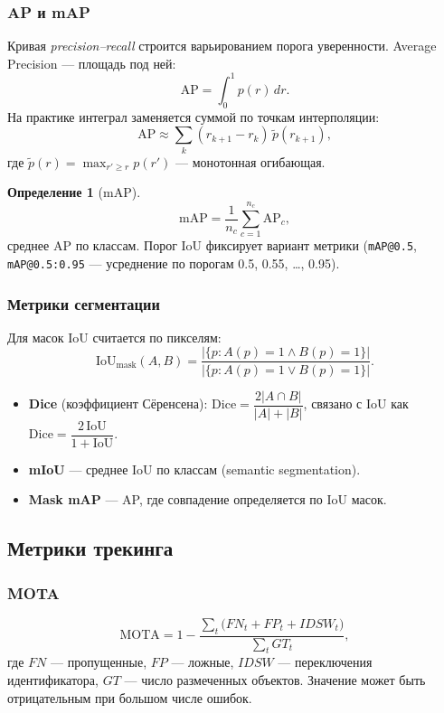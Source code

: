 \documentclass[11pt,a4paper]{article}
\theoremstyle{definition}
\newtheorem{definition}{Определение}[section]
\theoremstyle{remark}
\begin{document}
\subsubsection{AP и mAP}

Кривая \emph{precision--recall} строится варьированием порога уверенности.
Average Precision --- площадь под ней:
\[
  \mathrm{AP} = \int_0^1 p(r)\, dr .
\]
На практике интеграл заменяется суммой по точкам интерполяции:
\[
  \mathrm{AP} \approx \sum_k (r_{k+1} - r_k)\, \tilde{p}(r_{k+1}),
\]
где $\tilde{p}(r) = \max_{r' \ge r} p(r')$ --- монотонная огибающая.

\begin{definition}[mAP]
\[
  \mathrm{mAP} = \frac{1}{n_c} \sum_{c=1}^{n_c} \mathrm{AP}_c ,
\]
среднее AP по классам. Порог IoU фиксирует вариант метрики
(\texttt{mAP@0.5}, \texttt{mAP@0.5:0.95} --- усреднение по порогам
0.5, 0.55, \dots, 0.95).
\end{definition}

\subsubsection{Метрики сегментации}

Для масок IoU считается по пикселям:
\[
  \mathrm{IoU}_{\text{mask}}(A,B)
  = \frac{|\{p : A(p) = 1 \wedge B(p) = 1\}|}
         {|\{p : A(p) = 1 \vee B(p) = 1\}|}.
\]
\begin{itemize}
  \item \textbf{Dice} (коэффициент Сёренсена):
        $\mathrm{Dice} = \dfrac{2|A \cap B|}{|A| + |B|}$,
        связано с IoU как $\mathrm{Dice} = \dfrac{2\,\mathrm{IoU}}{1 + \mathrm{IoU}}$.
  \item \textbf{mIoU} --- среднее IoU по классам (semantic segmentation).
  \item \textbf{Mask mAP} --- AP, где совпадение определяется по IoU масок.
\end{itemize}

\subsection{Метрики трекинга}

\subsubsection{MOTA}

\[
  \mathrm{MOTA} = 1 - \frac{\sum_t \bigl(FN_t + FP_t + IDSW_t\bigr)}{\sum_t GT_t},
\]
где $FN$ --- пропущенные, $FP$ --- ложные, $IDSW$ --- переключения
идентификатора, $GT$ --- число размеченных объектов. Значение может быть
отрицательным при большом числе ошибок.
\end{document}
